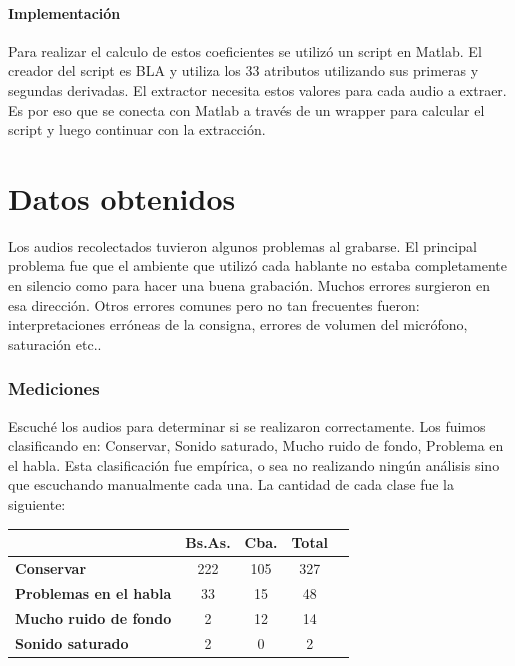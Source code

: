 \documentclass[11pt,a4paper,twoside]{tesis}
\begin{document}
\subsubsection{Implementación}

Para realizar el calculo de estos coeficientes se utilizó un script en Matlab. El creador del script es BLA y utiliza los 33 atributos utilizando sus primeras y segundas derivadas. El extractor necesita estos valores para cada audio a extraer. Es por eso que se conecta con Matlab a través de un wrapper para calcular el script y luego continuar con la extracción.

\chapter{Datos obtenidos}

Los audios recolectados tuvieron algunos problemas al grabarse. El principal problema fue que el ambiente que utilizó cada hablante no estaba completamente en silencio como para hacer una buena grabación. Muchos errores surgieron en esa dirección. Otros errores comunes pero no tan frecuentes fueron: interpretaciones erróneas de la consigna, errores de volumen del micrófono, saturación etc.. 

\subsection{Mediciones}

Escuché los audios para determinar si se realizaron correctamente. Los fuimos clasificando en: Conservar, Sonido saturado, Mucho ruido de fondo, Problema en el habla. Esta clasificación fue empírica, o sea no realizando ningún análisis sino que escuchando manualmente cada una. La cantidad de cada clase fue la siguiente:

\begin{table}[h]
\centering
\begin{tabular}{|l|c|c|c|c|}
\hline
\textbf{}  & \textbf{Bs.As. } & \textbf{Cba.} & \textbf{Total} \\ \hline
\textbf{Conservar}  & 222 & 105 & 327 \\ \hline
\textbf{Problemas en el habla}  & 33 & 15 & 48 \\ \hline
\textbf{Mucho ruido de fondo}  & 2 & 12 & 14 \\ \hline
\textbf{Sonido saturado}  & 2 & 0 & 2 \\ \hline
\end{tabular}
\end{table}
\end{document}
